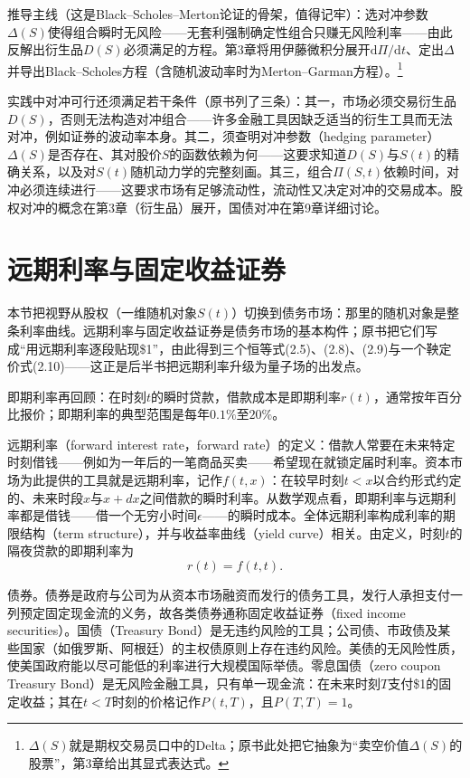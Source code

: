 推导主线（这是Black--Scholes--Merton论证的骨架，值得记牢）：选对冲参数$\Delta(S)$使得组合瞬时无风险——无套利强制确定性组合只赚无风险利率——由此反解出衍生品$D(S)$必须满足的方程。第3章将用伊藤微积分展开$\mathrm{d}\Pi/\mathrm{d}t$、定出$\Delta$并导出Black--Scholes方程（含随机波动率时为Merton--Garman方程）。\footnote{$\Delta(S)$就是期权交易员口中的Delta；原书此处把它抽象为“卖空价值$\Delta(S)$的股票”，第3章给出其显式表达式。}

实践中对冲可行还须满足若干条件（原书列了三条）：其一，市场必须交易衍生品$D(S)$，否则无法构造对冲组合——许多金融工具因缺乏适当的衍生工具而无法对冲，例如证券的波动率本身。其二，须查明对冲参数（hedging parameter）$\Delta(S)$是否存在、其对股价$S$的函数依赖为何——这要求知道$D(S)$与$S(t)$的精确关系，以及对$S(t)$随机动力学的完整刻画。其三，组合$\Pi(S,t)$依赖时间，对冲必须连续进行——这要求市场有足够流动性，流动性又决定对冲的交易成本。股权对冲的概念在第3章（衍生品）展开，国债对冲在第9章详细讨论。

\section{远期利率与固定收益证券}

本节把视野从股权（一维随机对象$S(t)$）切换到债务市场：那里的随机对象是整条利率曲线。远期利率与固定收益证券是债务市场的基本构件；原书把它们写成“用远期利率逐段贴现\$1”，由此得到三个恒等式(2.5)、(2.8)、(2.9)与一个鞅定价式(2.10)——这正是后半书把远期利率升级为量子场的出发点。

即期利率再回顾：在时刻$t$的瞬时贷款，借款成本是即期利率$r(t)$，通常按年百分比报价；即期利率的典型范围是每年$0.1\%$至$20\%$。

远期利率（forward interest rate，forward rate）的定义：借款人常要在未来特定时刻借钱——例如为一年后的一笔商品买卖——希望现在就锁定届时利率。资本市场为此提供的工具就是远期利率，记作$f(t,x)$：在较早时刻$t<x$以合约形式约定的、未来时段$x$与$x+dx$之间借款的瞬时利率。从数学观点看，即期利率与远期利率都是借钱——借一个无穷小时间$\epsilon$——的瞬时成本。全体远期利率构成利率的期限结构（term structure），并与收益率曲线（yield curve）相关。由定义，时刻$t$的隔夜贷款的即期利率为
\begin{equation*}
r(t)=f(t,t).
\tag{2.5}
\end{equation*}

债券。债券是政府与公司为从资本市场融资而发行的债务工具，发行人承担支付一列预定固定现金流的义务，故各类债券通称固定收益证券（fixed income securities）。国债（Treasury Bond）是无违约风险的工具；公司债、市政债及某些国家（如俄罗斯、阿根廷）的主权债原则上存在违约风险。美债的无风险性质，使美国政府能以尽可能低的利率进行大规模国际举债。零息国债（zero coupon Treasury Bond）是无风险金融工具，只有单一现金流：在未来时刻$T$支付\$1的固定收益；其在$t<T$时刻的价格记作$P(t,T)$，且$P(T,T)=1$。

